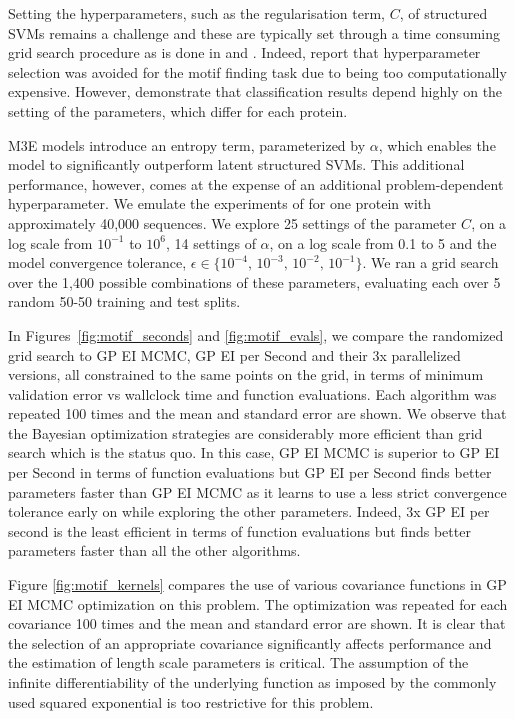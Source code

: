 \documentclass[aos,preprint]{imsart}
\begin{document}
Setting the hyperparameters, such as the regularisation term, $C$, of
structured SVMs remains a challenge and these are typically set
through a time consuming grid search procedure as is done in
\citet{Miller-etal-2012} and \citet{Yu-Joachims-2009}. Indeed,
\citet{Kumar-etal-2010} report that hyperparameter selection was
avoided for the motif finding task due to being too computationally
expensive.  However, \citet{Miller-etal-2012} demonstrate that
classification results depend highly on the setting of the parameters,
which differ for each protein.

M3E models introduce an entropy term, parameterized by $\alpha$, which
enables the model to significantly outperform latent structured
SVMs. This additional performance, however, comes at the expense of an
additional problem-dependent hyperparameter.  We emulate the
experiments of \citet{Miller-etal-2012} for one protein with
approximately 40,000 sequences. We explore 25 settings of the
parameter $C$, on a log scale from $10^{-1}$ to $10^6$, 14 settings of
$\alpha$, on a log scale from 0.1 to 5 and the model convergence
tolerance, ${\epsilon \in
\{10^{-4},\,10^{-3},\,10^{-2},\,10^{-1}\}}$.  We ran a grid search
over the 1,400 possible combinations of these parameters, evaluating
each over 5 random 50-50 training and test splits.

In Figures~\ref{fig:motif_seconds} and \ref{fig:motif_evals}, we
compare the randomized grid search to GP EI MCMC, GP EI per Second and
their 3x parallelized versions, all constrained to the same points on
the grid, in terms of minimum validation error vs wallclock time and
function evaluations. Each algorithm was repeated 100 times and the
mean and standard error are shown. We observe that the Bayesian
optimization strategies are considerably more efficient than grid
search which is the status quo. In this case, GP EI MCMC is superior
to GP EI per Second in terms of function evaluations but GP EI per
Second finds better parameters faster than GP EI MCMC as it learns to
use a less strict convergence tolerance early on while exploring the
other parameters. Indeed, 3x GP EI per second is the least efficient
in terms of function evaluations but finds better parameters faster
than all the other algorithms.

Figure \ref{fig:motif_kernels} compares the use of various covariance
functions in GP EI MCMC optimization on this problem.  The
optimization was repeated for each covariance 100 times and the mean
and standard error are shown.  It is clear that the selection of an
appropriate covariance significantly affects performance and the
estimation of length scale parameters is critical.  The assumption of
the infinite differentiability of the underlying function as imposed
by the commonly used squared exponential is too restrictive for this
problem.
\end{document}
